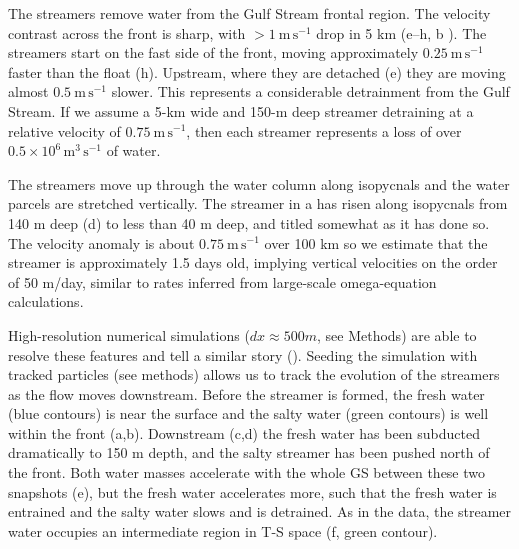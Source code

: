 \documentclass{natureJMK}
\begin{document}
The streamers remove water from the Gulf Stream frontal region.  The velocity contrast across the front is  sharp, with $>1\ \mathrm{m\,s^{-1}}$ drop in 5 km (e--h, b ).  The streamers start on the fast side of the front, moving approximately $0.25\ \mathrm{m\,s^{-1}}$ faster than the float (h). Upstream, where they are detached (e) they are moving almost $0.5\ \mathrm{m\,s^{-1}}$ slower.  This represents a considerable detrainment from the Gulf Stream.  If we assume a 5-km wide and 150-m deep streamer detraining at a relative velocity of $0.75\ \mathrm{m\,s^{-1}}$, then each streamer represents a loss of over $0.5\times10^{6}\, \mathrm{m^{3}\,s^{-1}}$ of water.  

The streamers move up through the water column along isopycnals and the water parcels are stretched vertically. The streamer in a has risen along isopycnals from 140 m deep (d)  to less than 40 m deep, and titled somewhat as it has done so.   The velocity anomaly is about $0.75\ \mathrm{m\,s^{-1}}$ over 100 km so we estimate that the streamer is approximately 1.5 days old,  implying vertical velocities on the order of 50 m/day, similar to rates inferred from large-scale omega-equation calculations\cite{thomasjoyce10}.  

High-resolution numerical simulations ($dx\approx 500 m$, see Methods) are able to resolve these features and tell a similar story (). Seeding the simulation with tracked particles (see methods) allows us to track the evolution of the streamers as the flow moves downstream.  Before the streamer is formed, the fresh water (blue contours) is near the surface and the salty water (green contours) is well within the front (a,b).  Downstream (c,d) the fresh water has been subducted dramatically to 150 m depth, and the salty streamer has been pushed north of the front.  Both water masses accelerate with the whole GS between these two snapshots (e), but the fresh water accelerates more, such that the fresh water is entrained and the salty water slows and is detrained.  As in the data, the streamer water occupies an intermediate region in T-S space (f, green contour).  
\end{document}
